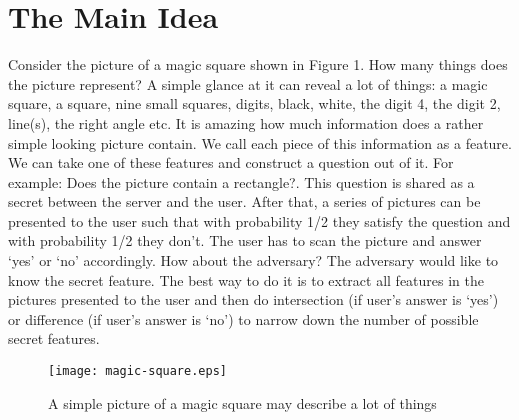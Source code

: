 \documentclass{llncs}
\begin{document}
\section{The Main Idea}
Consider the picture of a magic square shown in Figure 1. How many things does the picture represent? A simple glance at it can reveal a lot of things: a magic square, a square, nine small squares, digits, black, white, the digit 4, the digit 2, line(s), the right angle etc. It is amazing how much information does a rather simple looking picture contain. We call each piece of this information as a feature. We can take one of these features and construct a question out of it. For example: Does the picture contain a rectangle?. This question is shared as a secret between the server and the user. After that, a series of pictures can be presented to the user such that with probability 1/2 they satisfy the question and with probability 1/2 they don't. The user has to scan the picture and answer `yes' or `no' accordingly. How about the adversary? The adversary would like to know the secret feature. The best way to do it is to extract all features in the pictures presented to the user and then do intersection (if user's answer is `yes') or difference (if user's answer is `no') to narrow down the number of possible secret features. 
\begin{figure}[ht]
\centerline{\texttt{[image: magic-square.eps]}}
\caption{A simple picture of a magic square may describe a lot of things}
\label{fig5}
\end{figure}
\end{document}

